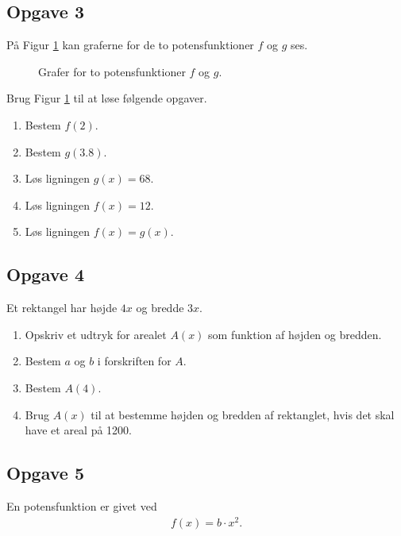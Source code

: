 \subsection*{Opgave 3}
På Figur \ref{fig:opgavegrafer} kan graferne for de to potensfunktioner $f$ og $g$ ses. 
\begin{figure}[H]
	\center
	\caption{Grafer for to potensfunktioner $f$ og $g$.}
	\label{fig:opgavegrafer}
\end{figure}
Brug Figur \ref{fig:opgavegrafer} til at løse følgende opgaver.
\begin{enumerate}[label=\roman*)]
	\item Bestem $f(2)$.
	\item Bestem $g(3.8)$.
	\item Løs ligningen $g(x) = 68$.
	\item Løs ligningen $f(x) = 12$.
	\item Løs ligningen $f(x) = g(x)$.
\end{enumerate}

\subsection*{Opgave 4}
Et rektangel har højde $4x$ og bredde $3x$. 
\begin{enumerate}[label=\roman*)]
	\item Opskriv et udtryk for arealet $A(x)$ som funktion af højden og bredden. 
	\item Bestem $a$ og $b$ i forskriften for $A$. 
	\item Bestem $A(4)$.
	\item Brug $A(x)$ til at bestemme højden og bredden af rektanglet, hvis det skal have et areal på 1200.
\end{enumerate}

\subsection*{Opgave 5}
En potensfunktion er givet ved 
\begin{align*}
	f(x) = b\cdot x^2.
\end{align*}

